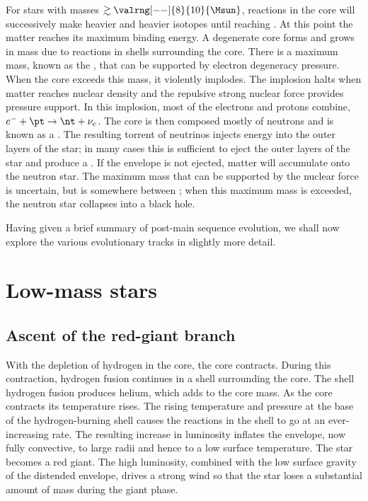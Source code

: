 For stars with masses $\gtrsim\valrng[--]{8}{10}{\Msun}$, reactions in the core will successively make heavier and heavier isotopes until reaching \iron. At this point the matter reaches its maximum binding energy. A degenerate core forms and grows in mass due to reactions in shells surrounding the core. There is a maximum mass, known as the , that can be supported by electron degeneracy pressure. When the core exceeds this mass, it violently implodes. The implosion halts when matter reaches nuclear density and the repulsive strong nuclear force provides pressure support. In this implosion, most of the electrons and protons combine, $e^{-} + \pt \to \nt+\nu_{e}$. The core is then composed mostly of neutrons and is known as a .
The resulting torrent of neutrinos injects energy into the outer layers of the star; in many cases this is sufficient to eject the outer layers of the star and produce a . If the envelope is not ejected, matter will accumulate onto the neutron star. The maximum mass that can be supported by the nuclear force is uncertain, but is somewhere between ; when this maximum mass is exceeded, the neutron star collapses into a black hole.

Having given a brief summary of post-main sequence evolution, we shall now explore the various evolutionary tracks in slightly more detail.

\section{Low-mass stars}

\subsection{Ascent of the red-giant branch}

With the depletion of hydrogen in the core, the core contracts. During this contraction, hydrogen fusion continues in a shell surrounding the core. The shell hydrogen fusion produces helium, which adds to the core mass. As the core contracts its temperature rises. The rising temperature and pressure at the base of the hydrogen-burning shell causes the reactions in the shell to go at an ever-increasing rate. The resulting increase in luminosity inflates the envelope, now fully convective, to large radii and hence to a low surface temperature. The star becomes a red giant. The high luminosity, combined with the low surface gravity of the distended envelope, drives a strong wind so that the star loses a substantial amount of mass during the giant phase.


